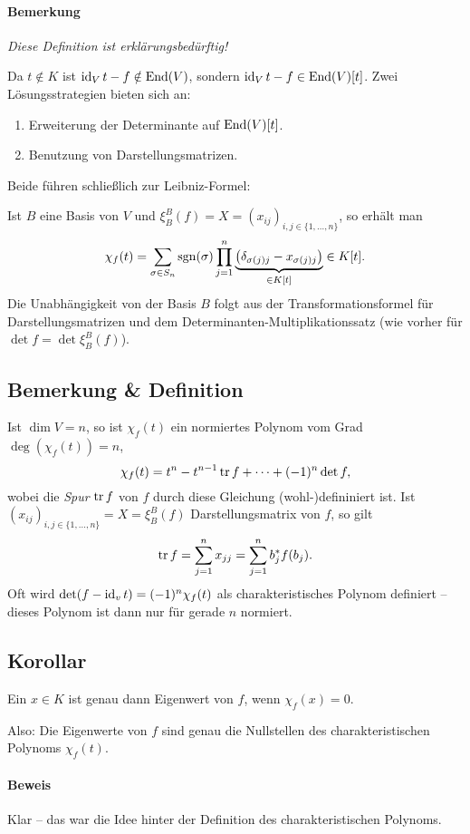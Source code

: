 \paragraph{Bemerkung}
	\emph{Diese Definition ist erklärungsbedürftig!}
	
	Da $ t\notin K $ ist $ \operatorname{id}_Vt-f\notin \operatorname{End}(V) $, sondern $ \operatorname{id}_Vt-f\in\operatorname{End}(V)[t] $. Zwei Lösungsstrategien bieten sich an:
		\begin{enumerate}
			\item Erweiterung der Determinante auf $ \operatorname{End}(V)[t] $.
			\item Benutzung von Darstellungsmatrizen.
		\end{enumerate}
	Beide führen schließlich zur Leibniz-Formel:
	
	Ist $ B $ eine Basis von $ V $ und $ \xi_B^B(f) = X = (x_{ij})_{i,j\in\{1,\dots,n\}}$, so erhält man 
		\[ \chi_f(t)=\sum_{\sigma\in S_n}\operatorname{sgn}(\sigma)\prod_{j=1}^{n}\underset{\in K[t]}{\underbrace{\left(\delta_{\sigma(j)j}-x_{\sigma(j)j}\right)}} \in K[t]. \]
	Die Unabhängigkeit von der Basis $ B $ folgt aus der Transformationsformel für Darstellungsmatrizen und dem Determinanten-Multiplikationssatz (wie vorher für $ \det f = \det \xi_B^B(f) $).


\subsection{Bemerkung \& Definition}
	Ist $ \dim V=n $, so ist $ \chi_f(t) $ ein normiertes Polynom vom Grad $ \deg\left(\chi_f(t)\right)=n $,
		\[ \chi_f(t)=t^n-t^{n-1}\operatorname{tr} f + \dots + (-1)^n\det f,\] %
	wobei die \emph{Spur} $ \operatorname{tr} f $ von $ f $ durch diese Gleichung (wohl-)defininiert ist.
	Ist $ (x_{ij})_{i,j\in\{1,\dots,n\}} = X = \xi_B^B(f) $ Darstellungsmatrix von $ f $, so gilt
		\[ \operatorname{tr} f = \sum_{j=1}^{n}x_{jj} = \sum_{j=1}^{n} b_j^*f(b_j). \]
	Oft wird $ \det(f-\operatorname{id}_vt)=(-1)^n\chi_f(t) $ als charakteristisches Polynom definiert -- dieses Polynom ist dann nur für gerade $ n $ normiert.
\subsection{Korollar}
	Ein $ x\in K $ ist genau dann Eigenwert von $ f $, wenn $ \chi_f(x)=0 $.
	
	Also: Die Eigenwerte von $ f $ sind genau die Nullstellen des charakteristischen Polynoms $ \chi_f(t) $.
\paragraph{Beweis}
	Klar -- das war die Idee hinter der Definition des charakteristischen Polynoms.
